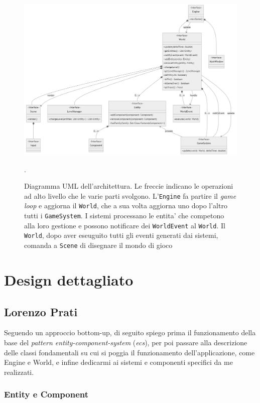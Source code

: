 \documentclass[a4paper,12pt]{report}
\begin{document}
\begin{figure}[]
	\centering
	\includegraphics[width=\textwidth]{uml/uml_architettura.png}
	\caption{Diagramma UML dell'architettura. Le freccie indicano le operazioni ad alto livello che le varie parti svolgono. L'\texttt{Engine} fa partire il \textit{game loop} e aggiorna il \texttt{World}, che a sua volta aggiorna uno dopo l'altro tutti i \texttt{GameSystem}. I sistemi processano le entita' che competono alla loro gestione e possono notificare dei \texttt{WorldEvent} al \texttt{World}. Il \texttt{World}, dopo aver eseuguito tutti gli eventi generati dai sistemi, comanda a \texttt{Scene} di disegnare il mondo di gioco}.
\end{figure}

\pagebreak

\section{Design dettagliato}

\subsection{Lorenzo Prati}

Seguendo un approccio bottom-up, di seguito spiego prima il funzionamento della base del \textit{pattern entity-component-system} (\textit{ecs}), per poi passare alla descrizione delle classi fondamentali su cui si poggia il funzionamento dell'applicazione, come Engine e World, e infine dedicarmi ai sistemi e componenti specifici da me realizzati.

\subsubsection{Entity e Component}
\end{document}
